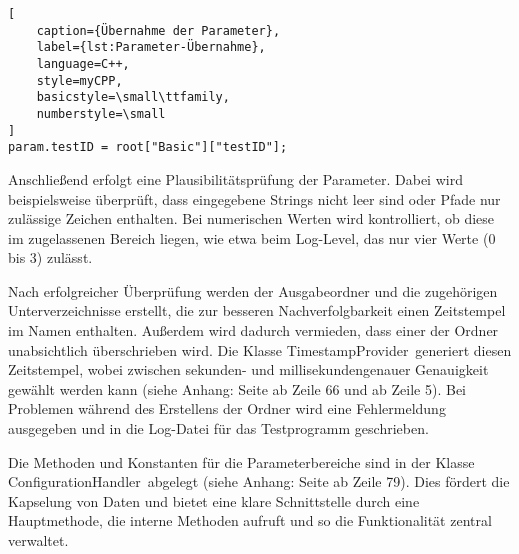 \vspace{12pt}

\begin{lstlisting}[
    caption={Übernahme der Parameter},
    label={lst:Parameter-Übernahme},
    language=C++,
    style=myCPP,
    basicstyle=\small\ttfamily,
    numberstyle=\small
]
param.testID = root["Basic"]["testID"];
\end{lstlisting}

Anschließend erfolgt eine Plausibilitätsprüfung der Parameter. Dabei wird beispielsweise überprüft, dass eingegebene Strings nicht leer sind oder Pfade nur zulässige Zeichen 
enthalten. Bei numerischen Werten wird kontrolliert, ob diese im zugelassenen Bereich liegen, wie etwa beim Log-Level, das nur vier Werte (0 bis 3) zulässt.

Nach erfolgreicher Überprüfung werden der Ausgabeordner und die zugehörigen Unterverzeichnisse erstellt, die zur besseren Nachverfolgbarkeit einen Zeitstempel im Namen enthalten. Außerdem
wird dadurch vermieden, dass einer der Ordner unabsichtlich überschrieben wird.
Die Klasse \glqq TimestampProvider\grqq\ generiert diesen Zeitstempel, wobei zwischen sekunden- und millisekundengenauer Genauigkeit gewählt werden kann (siehe Anhang: Seite \pageref{TimestampProvider1} ab Zeile 66 und \pageref{TimestampProvider2} ab Zeile 5). Bei Problemen während des 
Erstellens der Ordner wird eine Fehlermeldung ausgegeben und in die Log-Datei für das Testprogramm geschrieben.

Die Methoden und Konstanten für die Parameterbereiche sind in der Klasse \glqq ConfigurationHandler\grqq\ abgelegt (siehe Anhang: Seite \pageref{ConfigurationHandler} ab Zeile 79). Dies fördert die Kapselung von Daten und bietet eine klare 
Schnittstelle durch eine Hauptmethode, die interne Methoden aufruft und so die Funktionalität zentral verwaltet.